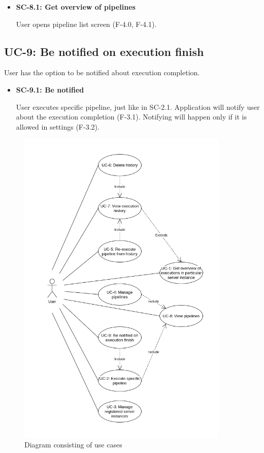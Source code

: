 \begin{itemize}
\item \textbf{SC-8.1: Get overview of pipelines}

User opens pipeline list screen (F-4.0, F-4.1).
\end{itemize}


\subsection*{UC-9: Be notified on execution finish}
User has the option to be notified about execution completion.

\begin{itemize}
\item \textbf{SC-9.1: Be notified}

User executes specific pipeline, just like in SC-2.1. Application will notify user about the execution completion (F-3.1). Notifying will happen only if it is allowed in settings (F-3.2).
\end{itemize}


\begin{figure}\centering
	\includegraphics[width=0.9\textwidth]{pics/bc-uc.png}
	\caption[Use cases]{Diagram consisting of use cases}\label{fig:uc}
\end{figure}